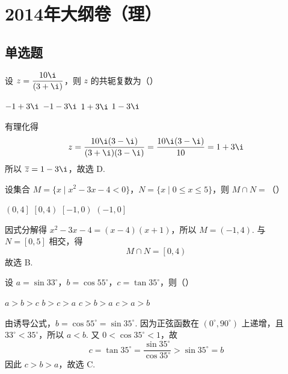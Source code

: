 \chapter{2014年大纲卷（理）}

\section{单选题}

\begin{problem}
设 \(z = \dfrac{10\i}{\left(3+\i\right)}\)，则 \(z\) 的共轭复数为（\quad）

\choices
    {\(-1 + 3\i\)}
    {\(-1 - 3\i\)}
    {\(1 + 3\i\)}
    {\(1 - 3\i\)}

\begin{solution}
有理化得
\[
z=\frac{10\i(3-\i)}{(3+\i)(3-\i)}
=\frac{10\i(3-\i)}{10}=1+3\i
\]
所以 \(\overline{z}=1-3\i\)，故选 D.
\end{solution}
\end{problem}

\begin{problem}
设集合 \(M = \{x \mid x^{2} - 3x - 4 < 0\}\)，\(N = \{x \mid 0 \leqslant x \leqslant 5\}\)，则 \(M \cap N =\)（\quad）

\choices
    {\(\left(0, 4\right]\)}
    {\(\left[0, 4\right)\)}
    {\(\left[-1, 0\right)\)}
    {\(\left(-1, 0\right]\)}

\begin{solution}
因式分解得 \(x^{2}-3x-4=(x-4)(x+1)\)，所以
\(M=\left(-1,4\right)\). 与 \(N=\left[0,5\right]\) 相交，得
\[
M\cap N=\left[0,4\right)
\]
故选 B.
\end{solution}
\end{problem}

\begin{problem}
设 \(a = \sin 33^{\circ}\)，\(b = \cos 55^{\circ}\)，\(c = \tan 35^{\circ}\)，则（\quad）

\choices
    {\(a > b > c\)}
    {\(b > c > a\)}
    {\(c > b > a\)}
    {\(c > a > b\)}

\begin{solution}
由诱导公式，\(b=\cos55^{\circ}=\sin35^{\circ}\). 因为正弦函数在
\(\left(0^{\circ},90^{\circ}\right)\) 上递增，且 \(33^{\circ}<35^{\circ}\)，所以
\(a<b\). 又 \(0<\cos35^{\circ}<1\)，故
\[
c=\tan35^{\circ}=\frac{\sin35^{\circ}}{\cos35^{\circ}}>\sin35^{\circ}=b
\]
因此 \(c>b>a\)，故选 C.
\end{solution}
\end{problem}

